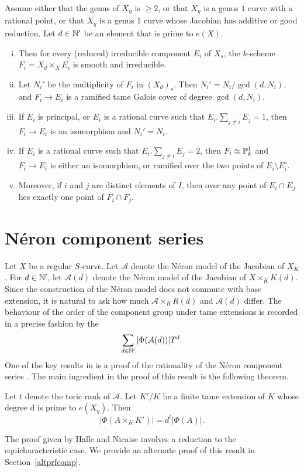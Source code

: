 \begin{lemma}\label{dgraphbaseext}\cite[Chapter~3, Lemma~2.3.2]{halnic}
 Assume either that the genus of $X_\eta$ is $\geq 2$, or that $X_\eta$ is a genus $1$ curve with a rational point, or that $X_\eta$ is a genus $1$ curve whose Jacobian has additive or good reduction. Let $d \in \N'$ be an element that is prime to $e(X)$. 
 \begin{enumerate}[(i)]
  \item  Then for every (reduced) irreducible component $E_i$ of $X_s$, the $k$-scheme $F_i = X_d \times_X E_i$ is smooth and irreducible. 
  \item Let $N_i'$ be the multiplicity of $F_i$ in $(X_d)_s$. Then $N_i' = N_i/\gcd(d,N_i)$, and $F_i \rightarrow E_i$ is a ramified tame Galois cover of degree $\gcd(d,N_i)$.
  \item If $E_i$ is principal, or $E_i$ is a rational curve such that $E_i.\sum_{j \neq i}E_j = 1$, then $F_i \rightarrow E_i$ is an isomorphism and $N_i' = N_i$. 
  \item If $E_i$ is a rational curve such that $E_i.\sum_{j \neq i}E_j = 2$, then $F_i \simeq \P^1_k$ and $F_i \rightarrow E_i$ is either an isomorphism, or ramified over the two points of $E_i \setminus E_i^\circ$. 
  \item Moreover, if $i$ and $j$ are distinct elements of $I$, then over any point of $E_i \cap E_j$ lies exactly one point of $F_i \cap F_j$.
 \end{enumerate}
\end{lemma}

\section{N\'{e}ron component series}\label{defcompser}
Let $X$ be a regular $S$-curve. Let $\mathcal{A}$ denote the N\'{e}ron model of the Jacobian of $X_K$. For $d \in \N'$, let $\mathcal{A}(d)$ denote the N\'{e}ron model of the Jacobian of $X \times_K K(d)$. Since the construction of the N\'{e}ron model does not commute with base extension, it is natural to ask how much $\mathcal{A} \times_R R(d)$ and $\mathcal{A}(d)$ differ. The behaviour of the order of the component group under tame extensions is recorded in a precise fashion by the {}
\[ \sum_{d \in \N'} |\Phi(\mathcal{A}(d))|T^d . \]
One of the key results in \cite{halnic} is a proof of the rationality of the N\'{e}ron component series \cite[Chapter~3, Theorem~3.1.5]{halnic}. The main ingredient in the proof of this result is the following theorem.
\begin{thm}\cite[Chapter~3, Proposition~3.1.1]{halnic}
 Let $t$ denote the toric rank of $\mathcal{A}$. Let $K'/K$ be a finite tame extension of $K$ whose degree d is prime to $e(X_\eta)$. Then
 \[ |\Phi(A \times_K K')| = d^t |\Phi(A)| .\]
\end{thm}
The proof given by Halle and Nicaise involves a reduction to the equicharacteristic case. We provide an alternate proof of this result in Section~\ref{altprfcomp}.

